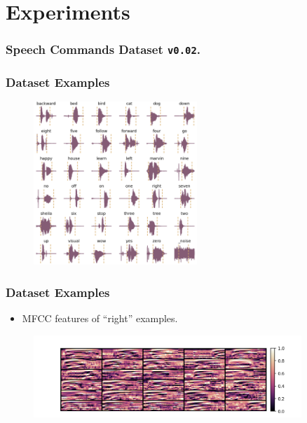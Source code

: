 
\section{Experiments}

\begin{frame}
  \frametitle{Speech Commands Dataset \texttt{v0.02}.}
  
\end{frame}

\begin{frame}
  \frametitle{Dataset Examples}
  \begin{figure}[!ht]
    \centering
      \includegraphics[width=0.55\textwidth]{../5_exp/figs/exp_dataset_speech_cmd_wav_grid.png}
  \end{figure}
\end{frame}

\begin{frame}
  \frametitle{Dataset Examples}
  \begin{itemize}
    \item MFCC features of \enquote{right} examples.
  \end{itemize}
  \begin{figure}[!ht]
    \centering
    \includegraphics[width=0.9\textwidth]{../5_exp/figs/exp_dataset_speech_cmd_mfcc_right.png}
  \end{figure}
\end{frame}

